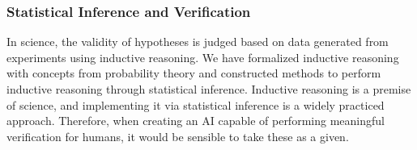 




\subsubsection{Statistical Inference and Verification}
In science, the validity of hypotheses is judged based on data generated from experiments using inductive reasoning. We have formalized inductive reasoning with concepts from probability theory and constructed methods to perform inductive reasoning through statistical inference. Inductive reasoning is a premise of science, and implementing it via statistical inference is a widely practiced approach. Therefore, when creating an AI capable of performing meaningful verification for humans, it would be sensible to take these as a given.


